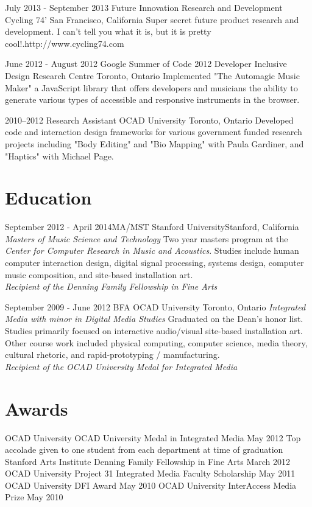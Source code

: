 \documentclass[10pt,a4paper,sans]{moderncv}   %
\begin{document}
\cventry
  {July 2013 - September 2013}
  {Future Innovation Research and Development}
  {Cycling 74'}
  {San Francisco, California}{}
  {Super secret future product research and development. I can't tell you what it is, but it is pretty cool!.\newline{}http://www.cycling74.com}

\cventry
  {June 2012 - August 2012}
  {Google Summer of Code 2012 Developer}
  {Inclusive Design Research Centre}
  {Toronto, Ontario}{}
  {Implemented "The Automagic Music Maker" a JavaScript library that offers developers and musicians the ability to generate various types of accessible and responsive instruments in the browser.}

 \cventry
   {2010--2012}
   {Research Assistant}
   {OCAD University}
   {Toronto, Ontario}{}
   {Developed code and interaction design frameworks for various government funded research projects including "Body Editing" and "Bio Mapping" with Paula Gardiner, and "Haptics" with Michael Page.}

\section{Education}

\cventry
  {September 2012 - April 2014}{MA/MST}
  {Stanford University}{Stanford, California}
  {\textit{Masters of Music Science and Technology}}
  {Two year masters program at the \textit{Center for Computer Research in Music and Acoustics}.  Studies include human computer interaction design, digital signal processing, systems design, computer music composition, and site-based installation art. \\\textit{Recipient of the Denning Family Fellowship in Fine Arts }}

\cventry
  {September 2009 - June 2012}
  {BFA}
  {OCAD University}
  {Toronto, Ontario}
  {\textit{Integrated Media with minor in Digital Media Studies}}
  {Graduated on the Dean's honor list. Studies primarily focused on interactive audio/visual site-based installation art.  Other course work included physical computing, computer science, media theory, cultural rhetoric, and rapid-prototyping / manufacturing. \\\textit{Recipient of the OCAD University Medal for Integrated Media }}

 \section{Awards}
 \cventry
   {}{OCAD University}
   {OCAD University Medal in Integrated Media}
   {May 2012}{}
   {Top accolade given to one student from each department at time of graduation}
 \cventry
   {}{Stanford Arts Institute}
   {Denning Family Fellowship in Fine Arts}
   {March 2012}{}{}
 \cventry
   {}{OCAD University}
   {Project 31 Integrated Media Faculty Scholarship}
   {May 2011}{}{}
 \cventry
   {}{OCAD University}
   {DFI Award}
   {May 2010}{}{}
 \cventry
   {}{OCAD University}
   {InterAccess Media Prize}
   {May 2010}{}{}
\end{document}
